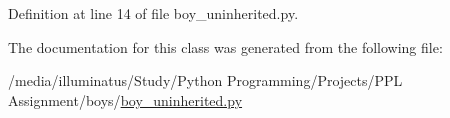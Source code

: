 Definition at line 14 of file boy\+\_\+uninherited.\+py.



The documentation for this class was generated from the following file\+:\begin{DoxyCompactItemize}
\item 
/media/illuminatus/\+Study/\+Python Programming/\+Projects/\+P\+P\+L Assignment/boys/\hyperlink{boy__uninherited_8py}{boy\+\_\+uninherited.\+py}\end{DoxyCompactItemize}
